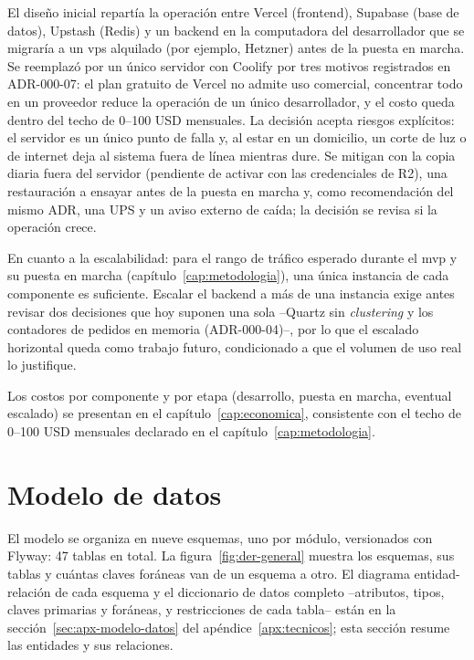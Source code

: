 El diseño inicial repartía la operación entre Vercel (frontend),
Supabase (base de datos), Upstash (Redis) y un backend en la computadora
del desarrollador que se migraría a un \gls{vps} alquilado (por ejemplo,
Hetzner) antes de la puesta en marcha. Se reemplazó por un único servidor con
Coolify por tres motivos registrados en ADR-000-07: el plan gratuito de
Vercel no admite uso comercial, concentrar todo en un proveedor reduce
la operación de un único desarrollador, y el costo queda dentro del techo
de 0--100 USD mensuales. La decisión acepta riesgos explícitos: el
servidor es un único punto de falla y, al estar en un domicilio, un corte
de luz o de internet deja al sistema fuera de línea mientras dure. Se
mitigan con la copia diaria fuera del servidor (pendiente de activar con
las credenciales de R2), una restauración a ensayar antes de la puesta en marcha
y, como recomendación del mismo ADR, una UPS y un aviso externo de caída;
la decisión se revisa si la operación crece.

En cuanto a la escalabilidad: para el rango de tráfico esperado durante
el \gls{mvp} y su puesta en marcha (capítulo~\ref{cap:metodologia}), una única
instancia de cada componente es suficiente. Escalar el backend a más de
una instancia exige antes revisar dos decisiones que hoy suponen una sola
--Quartz sin \emph{clustering} y los contadores de pedidos en memoria
(ADR-000-04)--, por lo que el escalado horizontal queda como trabajo
futuro, condicionado a que el volumen de uso real lo justifique.

Los costos por componente y por etapa (desarrollo, puesta en marcha,
eventual escalado) se presentan en el capítulo~\ref{cap:economica}, consistente
con el techo de 0--100 USD mensuales declarado en el
capítulo~\ref{cap:metodologia}.

\section{Modelo de datos}\label{sec:modelo-datos}

El modelo se organiza en nueve esquemas, uno por módulo, versionados con
Flyway: 47 tablas en total. La figura~\ref{fig:der-general} muestra los
esquemas, sus tablas y cuántas claves foráneas van de un esquema a otro.
El diagrama entidad-relación de cada esquema y el diccionario de datos
completo --atributos, tipos, claves primarias y foráneas, y
restricciones de cada tabla-- están en la
sección~\ref{sec:apx-modelo-datos} del apéndice~\ref{apx:tecnicos}; esta
sección resume las entidades y sus relaciones.

